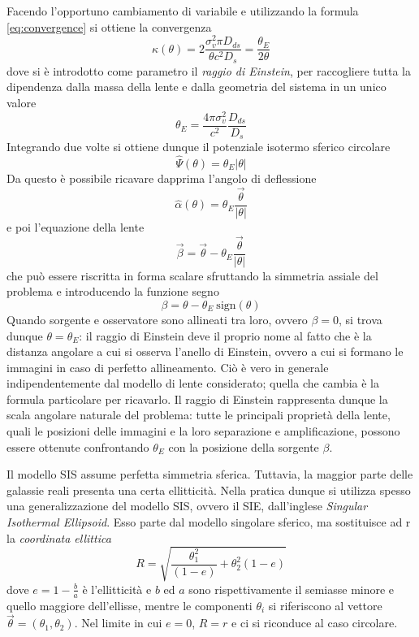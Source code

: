 Facendo l'opportuno cambiamento di variabile e utilizzando la formula \ref{eq:convergence} si ottiene la convergenza 
\begin{equation}
    \kappa(\theta)=2\frac{\sigma_v^2\pi D_{ds}}{\theta c^2 D_s}=\frac{\theta_E}{2\theta}
    \label{eq:SIS_kappa}
\end{equation}
dove si è introdotto come parametro il \emph{raggio di Einstein}, per raccogliere tutta la dipendenza dalla massa della lente e dalla geometria del sistema in un unico valore
\begin{equation}
    \theta_E=\frac{4\pi\sigma_v^2}{c^2}\frac{D_{ds}}{D_s}
    \label{eq:einstein_radius}
\end{equation}
Integrando due volte si ottiene dunque il potenziale isotermo sferico circolare
\begin{equation}
    \hat\Psi(\theta)=\theta_E|\theta|
    \label{eq:SIS}
\end{equation}
Da questo è possibile ricavare dapprima l'angolo di deflessione
\begin{equation}
    \hat\alpha(\theta)=\theta_E\frac{\vec\theta}{|\theta|}
\end{equation}
e poi l'equazione della lente
\begin{equation}
    \vec\beta=\vec\theta-\theta_E\frac{\vec\theta}{|\theta|}
\end{equation} 
che può essere riscritta in forma scalare sfruttando la simmetria assiale del problema e introducendo la funzione segno
\begin{equation}
    \beta=\theta-\theta_E\ \text{sign}(\theta)
\end{equation}
Quando sorgente e osservatore sono allineati tra loro, ovvero $\beta=0$,  si trova dunque $\theta=\theta_E$: il raggio di Einstein deve il proprio nome al fatto che è la distanza angolare a cui si osserva l'anello di Einstein, ovvero a cui si formano le immagini in caso di perfetto allineamento. Ciò è vero in generale indipendentemente dal modello di lente considerato; quella che cambia è la formula particolare per ricavarlo. 
Il raggio di Einstein rappresenta dunque la scala angolare naturale del problema: tutte le principali proprietà della lente, quali le posizioni delle immagini e la loro separazione e amplificazione, possono essere ottenute confrontando $\theta_E$ con la posizione della sorgente $\beta$.

Il modello SIS assume perfetta simmetria sferica. Tuttavia, la maggior parte delle galassie reali presenta una certa ellitticità. Nella pratica dunque si utilizza spesso una generalizzazione del modello SIS, ovvero il SIE, dall'inglese \emph{Singular Isothermal Ellipsoid}.
Esso parte dal modello singolare sferico, ma sostituisce ad r la \emph{coordinata ellittica}
\begin{equation}
    R=\sqrt{\frac{\theta_1^2}{(1-e)}+\theta_2^2(1-e)}
    \label{eq:ell_coordinate}
\end{equation}
dove $e=1-\frac{b}{a}$ è l'ellitticità e $b$ ed $a$ sono rispettivamente il semiasse minore e quello maggiore dell'ellisse, mentre le componenti $\theta_i$ si riferiscono al vettore $\vec\theta=(\theta_1, \theta_2)$. Nel limite in cui $e=0$, $R=r$ e ci si riconduce al caso circolare.


